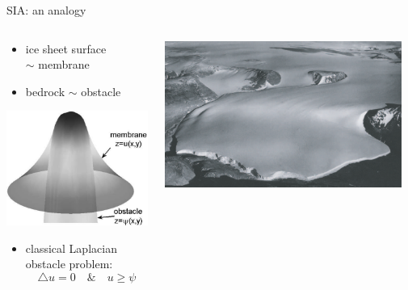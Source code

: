 \documentclass[hide notes,intlimits]{beamer}
\newcommand{\lap}{\triangle}
\begin{document}
\begin{frame}{SIA: an analogy}
\begin{columns}
\begin{column}{0.4\textwidth}
\begin{itemize}
\item ice sheet surface \\ $\sim$ \alert{membrane}
\item bedrock $\sim$ \alert{obstacle}
\end{itemize}
\begin{center}
\vspace{-2mm}
\includegraphics[width=\textwidth]{classicalobs}
\begin{itemize}
\item classical Laplacian obstacle problem:
   $$\lap u = 0 \quad \& \quad u\ge \psi$$
\end{itemize}
\end{center}
\end{column}
\begin{column}{0.55\textwidth}
\begin{center}
\includegraphics[width=0.95\textwidth]{polaris} \\

\end{center}
\end{column}
\end{columns}
\end{frame}
\end{document}
